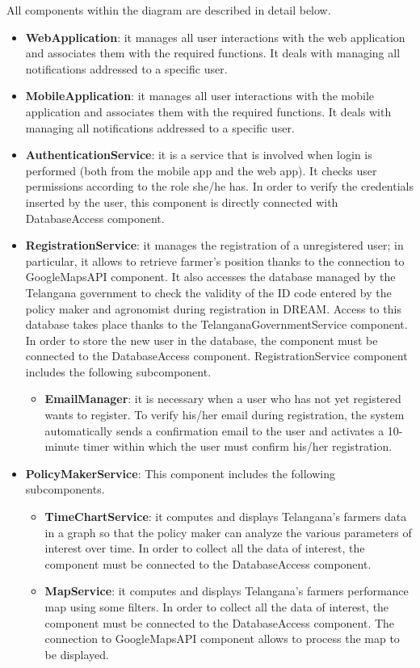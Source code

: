 All components within the diagram are described in detail below.
\begin{itemize}

\item \textbf{WebApplication}: it manages all user interactions with the web application and associates them with the required functions.
It deals with managing all notifications addressed to a specific user.

\item \textbf{MobileApplication}: it manages all user interactions with the mobile application and associates them with the required functions.
It deals with managing all notifications addressed to a specific user.

\item \textbf{AuthenticationService}: it is a service that is involved when login is performed (both from the mobile app and the web app). It checks user permissions according to the role she/he has.
In order to verify the credentials inserted by the user, this component is directly connected with DatabaseAccess component. 

\item \textbf{RegistrationService}: it manages the registration of a unregistered user; in particular, it allows to retrieve farmer's position thanks to the connection to GoogleMapsAPI component. It also accesses the database managed by the Telangana government to check the validity of the ID code entered by the policy maker and agronomist during registration in DREAM. Access to this database takes place thanks to the TelanganaGovernmentService component.
In order to store the new user in the database, the component must be connected to the DatabaseAccess component. 
RegistrationService component includes the following subcomponent.

\begin{itemize}

\item \textbf{EmailManager}: it is necessary when a user who has not yet registered wants to register. To verify his/her email during registration, the system automatically sends a confirmation email to the user and activates a 10-minute timer within which the user must confirm his/her registration.
\end{itemize}
\item \textbf{PolicyMakerService}: This component includes the following subcomponents.

\begin{itemize}
    \item \textbf{TimeChartService}: it computes and displays Telangana’s farmers data in a graph so that the policy maker can analyze the various parameters of interest over time.  In order to collect all the data of interest, the component must be connected to the DatabaseAccess component. 
    \item \textbf{MapService}: it computes and displays Telangana’s farmers performance map using some filters. In order to collect all the data of interest, the component must be connected to the DatabaseAccess component. The connection to GoogleMapsAPI component allows to process the map to be displayed. 
\end{itemize}


\end{itemize}
